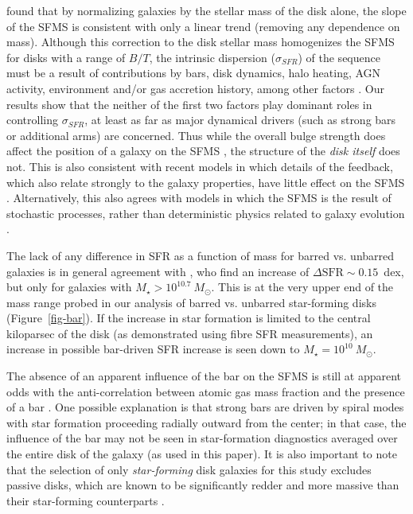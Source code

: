 \documentclass[useAMS,usenatbib]{mn2e}
\begin{document}
\citet{abr14} found that by normalizing galaxies by the stellar mass of the disk alone, the slope of the SFMS is consistent with only a linear trend (removing any dependence on mass). Although this correction to the disk stellar mass homogenizes the SFMS for disks with a range of $B/T$, the intrinsic dispersion ($\sigma_{SFR}$) of the sequence must be a result of contributions by bars, disk dynamics, halo heating, AGN activity, environment and/or gas accretion history, among other factors \citep{dut10}. Our results show that the neither of the first two factors play dominant roles in controlling $\sigma_{SFR}$, at least as far as major dynamical drivers (such as strong bars or additional arms) are concerned. Thus while the overall bulge strength does affect the position of a galaxy on the SFMS \citep{mar09,che12a,fan13,kav14,lan14,oma14}, the structure of the \emph{disk itself} does not. This is also consistent with recent models in which details of the feedback, which also relate strongly to the galaxy properties, have little effect on the SFMS \citep{hop14}. Alternatively, this also agrees with models in which the SFMS is the result of stochastic processes, rather than deterministic physics related to galaxy evolution \citep{kel14b}. 

The lack of any difference in SFR as a function of mass for barred vs. unbarred galaxies is in general agreement with \citet{ell11}, who find an increase of $\Delta\textrm{SFR}\sim0.15$~dex, but only for galaxies with $M_\star>10^{10.7}~M_\odot$. This is at the very upper end of the mass range probed in our analysis of barred vs. unbarred star-forming disks (Figure~\ref{fig-bar}). If the increase in star formation is limited to the central kiloparsec of the disk (as demonstrated using fibre SFR measurements), an increase in possible bar-driven SFR increase is seen down to $M_\star=10^{10}~M_\odot$. 

The absence of an apparent influence of the bar on the SFMS is still at apparent odds with the anti-correlation between atomic gas mass fraction and the presence of a bar \citep{mas12a}. One possible explanation is that strong bars are driven by spiral modes with star formation proceeding radially outward from the center; in that case, the influence of the bar may not be seen in star-formation diagnostics averaged over the entire disk of the galaxy (as used in this paper). It is also important to note that the selection of only \emph{star-forming} disk galaxies for this study excludes passive disks, which are known to be significantly redder and more massive than their star-forming counterparts \citep{mas10a,cor12}. 
\end{document}
